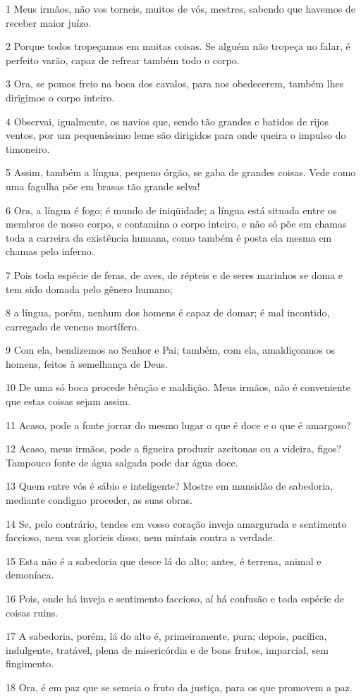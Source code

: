 \par 1 Meus irmãos, não vos torneis, muitos de vós, mestres, sabendo que havemos de receber maior juízo.
\par 2 Porque todos tropeçamos em muitas coisas. Se alguém não tropeça no falar, é perfeito varão, capaz de refrear também todo o corpo.
\par 3 Ora, se pomos freio na boca dos cavalos, para nos obedecerem, também lhes dirigimos o corpo inteiro.
\par 4 Observai, igualmente, os navios que, sendo tão grandes e batidos de rijos ventos, por um pequeníssimo leme são dirigidos para onde queira o impulso do timoneiro.
\par 5 Assim, também a língua, pequeno órgão, se gaba de grandes coisas. Vede como uma fagulha põe em brasas tão grande selva!
\par 6 Ora, a língua é fogo; é mundo de iniqüidade; a língua está situada entre os membros de nosso corpo, e contamina o corpo inteiro, e não só põe em chamas toda a carreira da existência humana, como também é posta ela mesma em chamas pelo inferno.
\par 7 Pois toda espécie de feras, de aves, de répteis e de seres marinhos se doma e tem sido domada pelo gênero humano;
\par 8 a língua, porém, nenhum dos homens é capaz de domar; é mal incontido, carregado de veneno mortífero.
\par 9 Com ela, bendizemos ao Senhor e Pai; também, com ela, amaldiçoamos os homens, feitos à semelhança de Deus.
\par 10 De uma só boca procede bênção e maldição. Meus irmãos, não é conveniente que estas coisas sejam assim.
\par 11 Acaso, pode a fonte jorrar do mesmo lugar o que é doce e o que é amargoso?
\par 12 Acaso, meus irmãos, pode a figueira produzir azeitonas ou a videira, figos? Tampouco fonte de água salgada pode dar água doce.
\par 13 Quem entre vós é sábio e inteligente? Mostre em mansidão de sabedoria, mediante condigno proceder, as suas obras.
\par 14 Se, pelo contrário, tendes em vosso coração inveja amargurada e sentimento faccioso, nem vos glorieis disso, nem mintais contra a verdade.
\par 15 Esta não é a sabedoria que desce lá do alto; antes, é terrena, animal e demoníaca.
\par 16 Pois, onde há inveja e sentimento faccioso, aí há confusão e toda espécie de coisas ruins.
\par 17 A sabedoria, porém, lá do alto é, primeiramente, pura; depois, pacífica, indulgente, tratável, plena de misericórdia e de bons frutos, imparcial, sem fingimento.
\par 18 Ora, é em paz que se semeia o fruto da justiça, para os que promovem a paz.

